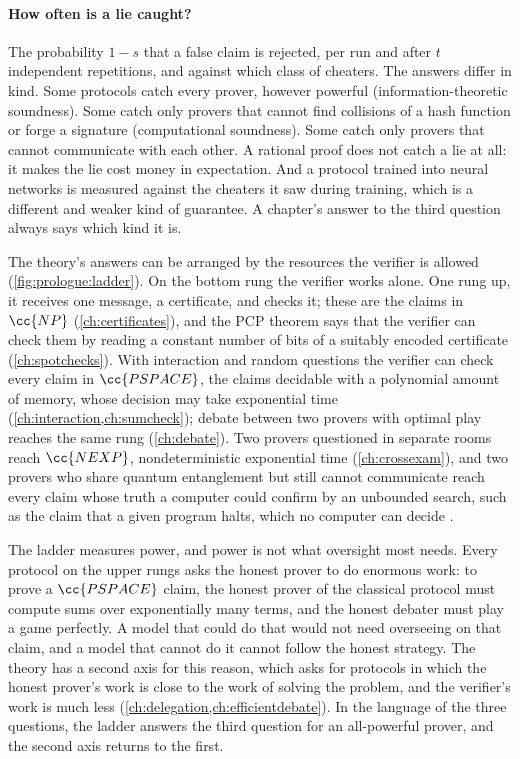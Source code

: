 \begin{refsection}
\paragraph{How often is a lie caught?} The probability $1-s$ that a false claim is rejected, per run and after $t$ independent repetitions, and against which class of cheaters. The answers differ in kind. Some protocols catch every prover, however powerful (information-theoretic soundness). Some catch only provers that cannot find collisions of a hash function or forge a signature (computational soundness). Some catch only provers that cannot communicate with each other. A rational proof does not catch a lie at all: it makes the lie cost money in expectation. And a protocol trained into neural networks is measured against the cheaters it saw during training, which is a different and weaker kind of guarantee. A chapter's answer to the third question always says which kind it is.


The theory's answers can be arranged by the resources the verifier is allowed (\cref{fig:prologue:ladder}). On the bottom rung the verifier works alone. One rung up, it receives one message, a certificate, and checks it; these are the claims in $\cc{NP}$ (\cref{ch:certificates}), and the PCP theorem says that the verifier can check them by reading a constant number of bits of a suitably encoded certificate (\cref{ch:spotchecks}). With interaction and random questions the verifier can check every claim in $\cc{PSPACE}$, the claims decidable with a polynomial amount of memory, whose decision may take exponential time (\cref{ch:interaction,ch:sumcheck}); debate between two provers with optimal play reaches the same rung (\cref{ch:debate}). Two provers questioned in separate rooms reach $\cc{NEXP}$, nondeterministic exponential time (\cref{ch:crossexam}), and two provers who share quantum entanglement but still cannot communicate reach every claim whose truth a computer could confirm by an unbounded search, such as the claim that a given program halts, which no computer can decide \parencite{JiEtAl2021}.

The ladder measures power, and power is not what oversight most needs. Every protocol on the upper rungs asks the honest prover to do enormous work: to prove a $\cc{PSPACE}$ claim, the honest prover of the classical protocol must compute sums over exponentially many terms, and the honest debater must play a game perfectly. A model that could do that would not need overseeing on that claim, and a model that cannot do it cannot follow the honest strategy. The theory has a second axis for this reason, which asks for protocols in which the honest prover's work is close to the work of solving the problem, and the verifier's work is much less (\cref{ch:delegation,ch:efficientdebate}). In the language of the three questions, the ladder answers the third question for an all-powerful prover, and the second axis returns to the first.


\end{refsection}
